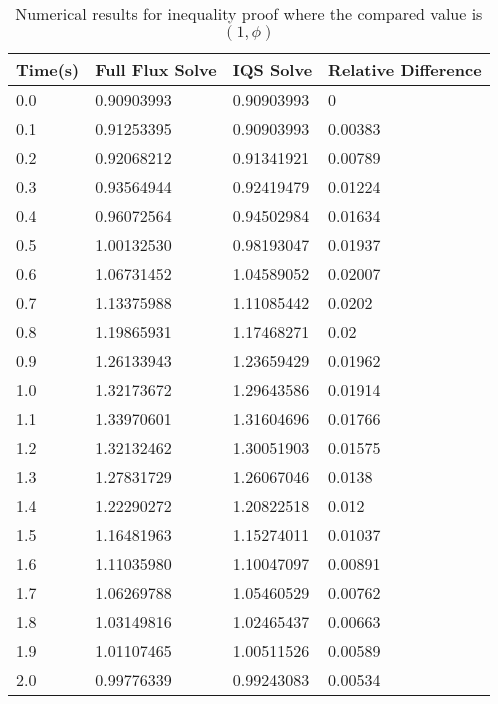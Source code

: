 \begin{table}
\centering
\caption{Numerical results for inequality proof where the compared value is $(1,\phi)$}
\label{tab:neq}
\begin{tabular}{|llll|}
\hline
Time(s) &	Full Flux Solve &	IQS Solve &	Relative Difference \\
\hline
0.0	&	0.90903993 &	0.90903993 &	0		\\
0.1 &	0.91253395 &	0.90903993 &	0.00383 \\
0.2 &	0.92068212 &	0.91341921 &	0.00789 \\
0.3 &	0.93564944 &	0.92419479 &	0.01224 \\
0.4 &	0.96072564 &	0.94502984 &	0.01634 \\
0.5 &	1.00132530 &	0.98193047 &	0.01937 \\
0.6 &	1.06731452 &	1.04589052 &	0.02007 \\
0.7 &	1.13375988 &	1.11085442 &	0.0202 \\
0.8 &	1.19865931 &	1.17468271 &	0.02 \\
0.9 &	1.26133943 &	1.23659429 &	0.01962 \\
1.0 &	1.32173672 &	1.29643586 &	0.01914 \\
1.1 &	1.33970601 &	1.31604696 &	0.01766 \\
1.2 &	1.32132462 &	1.30051903 &	0.01575 \\
1.3 &	1.27831729 &	1.26067046 &	0.0138 \\
1.4 &	1.22290272 &	1.20822518 &	0.012 \\
1.5 &	1.16481963 &	1.15274011 &	0.01037 \\
1.6 &	1.11035980 &	1.10047097 &	0.00891 \\
1.7 &	1.06269788 &	1.05460529 &	0.00762 \\
1.8 &	1.03149816 &	1.02465437 &	0.00663 \\
1.9 &	1.01107465 &	1.00511526 &	0.00589 \\
2.0 &	0.99776339 &	0.99243083 &	0.00534 \\
\hline
\end{tabular}
\end{table}
